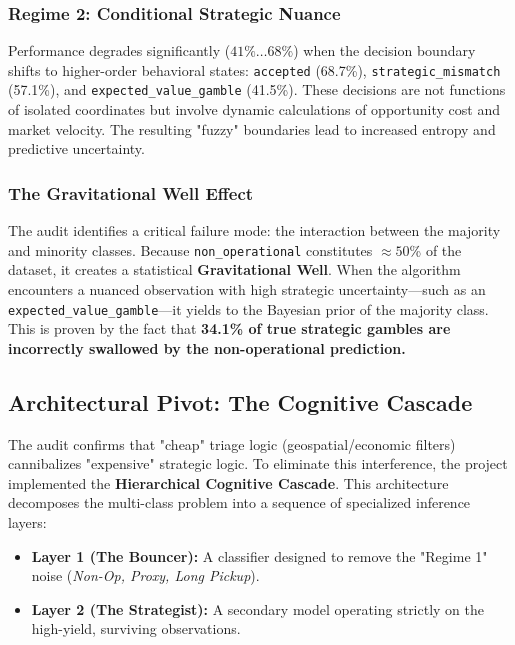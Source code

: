 \subsubsection{Regime 2: Conditional Strategic Nuance}
Performance degrades significantly ($41\% \dots 68\%$) when the decision boundary shifts to higher-order behavioral states: \texttt{accepted} (68.7\%), \texttt{strategic\_mismatch} (57.1\%), and \texttt{expected\_value\_gamble} (41.5\%). These decisions are not functions of isolated coordinates but involve dynamic calculations of opportunity cost and market velocity. The resulting "fuzzy" boundaries lead to increased entropy and predictive uncertainty.

\subsubsection{The Gravitational Well Effect}
The audit identifies a critical failure mode: the interaction between the majority and minority classes. Because \texttt{non\_operational} constitutes $\approx 50$\% of the dataset, it creates a statistical \textbf{Gravitational Well}. When the algorithm encounters a nuanced observation with high strategic uncertainty---such as an \texttt{expected\_value\_gamble}---it yields to the Bayesian prior of the majority class. This is proven by the fact that \textbf{34.1\% of true strategic gambles are incorrectly swallowed by the non-operational prediction.}


\subsection{Architectural Pivot: The Cognitive Cascade}
The audit confirms that "cheap" triage logic (geospatial/economic filters) cannibalizes "expensive" strategic logic. To eliminate this interference, the project implemented the \textbf{Hierarchical Cognitive Cascade}. This architecture decomposes the multi-class problem into a sequence of specialized inference layers:

\begin{itemize}[noitemsep, topsep=3pt]
    \item \textbf{Layer 1 (The Bouncer):} A classifier designed to remove the "Regime 1" noise (\textit{Non-Op, Proxy, Long Pickup}).
    \item \textbf{Layer 2 (The Strategist):} A secondary model operating strictly on the high-yield, surviving observations.
\end{itemize}

